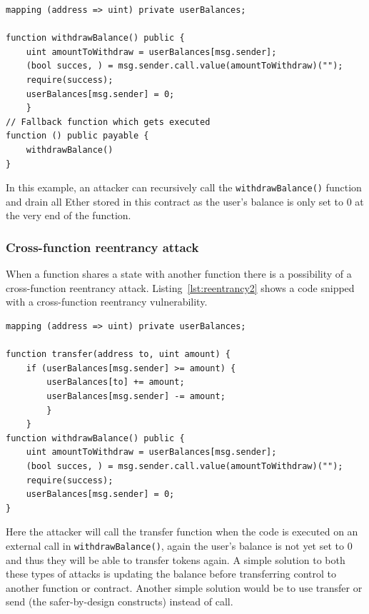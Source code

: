 \documentclass[10pt,conference]{IEEEtran}
\begin{document}
\begin{lstlisting}[language=Solidity, caption=Single function reentrancy attack, label=lst:reentrancy1]
mapping (address => uint) private userBalances;

function withdrawBalance() public {
    uint amountToWithdraw = userBalances[msg.sender];
    (bool succes, ) = msg.sender.call.value(amountToWithdraw)("");
    require(success);
    userBalances[msg.sender] = 0;
    }
// Fallback function which gets executed
function () public payable {
    withdrawBalance()
}
\end{lstlisting}

In this example,  an attacker can recursively call the \texttt{withdrawBalance()} function and drain all Ether stored in this contract as the user's balance is only set to 0 at the very end of the function.

\subsubsection{Cross-function reentrancy attack}
When a function shares a state with another function there is a possibility of a cross-function reentrancy attack.  Listing~\ref{lst:reentrancy2}  shows a code snipped with a cross-function reentrancy vulnerability. 

\begin{lstlisting}[language=Solidity, caption=Cross-function reentrancy attack, label=lst:reentrancy2]
mapping (address => uint) private userBalances;

function transfer(address to, uint amount) {
    if (userBalances[msg.sender] >= amount) {
        userBalances[to] += amount;
        userBalances[msg.sender] -= amount;
        }
    }
function withdrawBalance() public {
    uint amountToWithdraw = userBalances[msg.sender];
    (bool succes, ) = msg.sender.call.value(amountToWithdraw)("");
    require(success);
    userBalances[msg.sender] = 0;
}

\end{lstlisting}

Here the attacker will call the transfer function when the code is executed on an external call in \texttt{withdrawBalance()},  again the user's balance is not yet set to 0 and thus they will be able to transfer tokens again. A simple solution to both these types of attacks is updating the balance before transferring control to another function or contract.  Another simple solution would be to use transfer or send (the safer-by-design constructs) instead of call.
\end{document}
